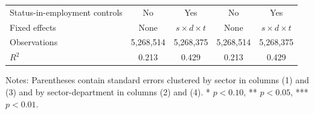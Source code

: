 \begin{table}[htbp]
\begin{tabular}{lcccc}
    Status-in-employment controls & No & Yes & No & Yes \\
    Fixed effects & None & $s\times d\times t$ & None & $s\times d\times t$ \\
    Observations & 5,268,514 & 5,268,375 & 5,268,514 & 5,268,375 \\
    $R^2$ & 0.213 & 0.429 & 0.213 & 0.429 \\
    \bottomrule
  \end{tabular}
  \vspace{0.3em}
  \begin{minipage}{0.95\textwidth}
  \footnotesize
  Notes: Parentheses contain standard errors clustered by sector in columns (1) and (3) and by sector-department in columns (2) and (4). * $p<0.10$, ** $p<0.05$, *** $p<0.01$.
  \end{minipage}
\end{table}
